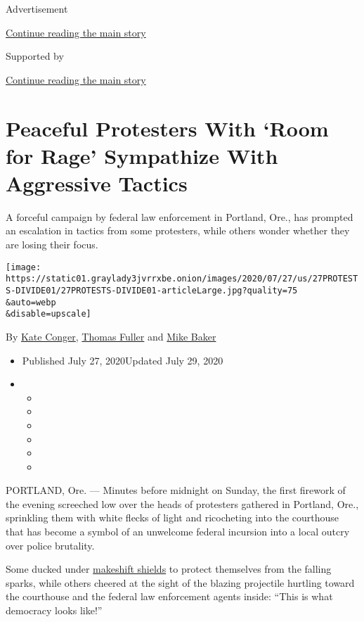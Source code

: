 Advertisement

\protect\hyperlink{after-top}{Continue reading the main story}

Supported by

\protect\hyperlink{after-sponsor}{Continue reading the main story}

\hypertarget{peaceful-protesters-with-room-for-rage-sympathize-with-aggressive-tactics}{%
\section{Peaceful Protesters With `Room for Rage' Sympathize With
Aggressive
Tactics}\label{peaceful-protesters-with-room-for-rage-sympathize-with-aggressive-tactics}}

A forceful campaign by federal law enforcement in Portland, Ore., has
prompted an escalation in tactics from some protesters, while others
wonder whether they are losing their focus.

\texttt{[image: https://static01.graylady3jvrrxbe.onion/images/2020/07/27/us/27PROTESTS-DIVIDE01/27PROTESTS-DIVIDE01-articleLarge.jpg?quality=75\\\&auto=webp\\\&disable=upscale]}

By \href{https://www.nytimes3xbfgragh.onion/by/kate-conger}{Kate
Conger},
\href{https://www.nytimes3xbfgragh.onion/by/thomas-fuller}{Thomas
Fuller} and \href{https://www.nytimes3xbfgragh.onion/by/mike-baker}{Mike
Baker}

\begin{itemize}
\item
  Published July 27, 2020Updated July 29, 2020
\item
  \begin{itemize}
  \item
  \item
  \item
  \item
  \item
  \item
  \end{itemize}
\end{itemize}

PORTLAND, Ore. --- Minutes before midnight on Sunday, the first firework
of the evening screeched low over the heads of protesters gathered in
Portland, Ore., sprinkling them with white flecks of light and
ricocheting into the courthouse that has become a symbol of an unwelcome
federal incursion into a local outcry over police brutality.

Some ducked under
\href{https://www.nytimes3xbfgragh.onion/2020/07/22/us/portland-protest-tactics.html}{makeshift
shields} to protect themselves from the falling sparks, while others
cheered at the sight of the blazing projectile hurtling toward the
courthouse and the federal law enforcement agents inside: ``This is what
democracy looks like!''

